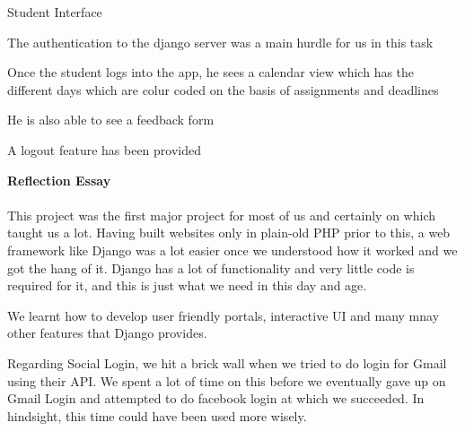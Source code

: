 \documentclass[11pt]{report}
\begin{document}
\begin{outline}
\begin{outline}
	\item Student Interface
    \begin{outline}
    	\item The authentication to the django server was a main hurdle for us in this task
    	\item Once the student logs into the app, he sees a calendar view which has the different days which are colur coded on the basis of assignments and deadlines
    	\item He is also able to see a feedback form
    	\item A logout feature has been provided
    	
	\end{outline}
\end{outline}
\end{outline}

\newpage
\textbf{Reflection Essay} \\ \\
This project was the first major project for most of us and certainly on which taught us a lot. Having built websites only in plain-old PHP prior to this, a web framework like Django was a lot easier once we understood how it worked and we got the hang of it. Django has a lot of functionality and very little code is required for it, and this is just what we need in this day and age.

	We learnt how to develop user friendly portals, interactive UI and many mnay other features that Django provides.

	Regarding Social Login, we hit a brick wall when we tried to do login for Gmail using their API. We spent a lot of time on this before we eventually gave up on Gmail Login and attempted to do facebook login at which we succeeded. In hindsight, this time could have been used more wisely.
\end{document}
